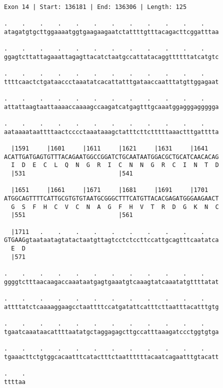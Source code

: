 \documentclass{article}
\begin{document}
\begin{Verbatim}
Exon 14 | Start: 136181 | End: 136306 | Length: 125
 
.    .    .    .    .    .    .    .    .    .    .    .    
atagatgtgcttggaaaatggtgaagaagaatctattttgtttacagacttcggatttaa
  
.    .    .    .    .    .    .    .    .    .    .    .    
ggagtcttattagaaattagagttacatctaatgccattatacaggttttttatcatgtc
  
.    .    .    .    .    .    .    .    .    .    .    .    
ttttcaactctgataaccctaaatatcacattatttgataaccaatttatgttggagaat
  
.    .    .    .    .    .    .    .    .    .    .    .    
attattaagtaattaaaaccaaaagccaagatcatgagtttgcaaatggagggaggggga
  
.    .    .    .    .    .    .    .    .    .    .    .    
aataaaataattttaactcccctaaataaagctatttcttctttttaaactttgatttta
  
  |1591     |1601     |1611     |1621     |1631     |1641   
ACATTGATGAGTGTTTACAGAATGGCCGGATCTGCAATAATGGACGCTGCATCAACACAG
  I  D  E  C  L  Q  N  G  R  I  C  N  N  G  R  C  I  N  T  D
  |531                          |541                        
  
  |1651     |1661     |1671     |1681     |1691     |1701   
ATGGCAGTTTTCATTGCGTGTGTAATGCGGGCTTTCATGTTACACGAGATGGGAAGAACT
  G  S  F  H  C  V  C  N  A  G  F  H  V  T  R  D  G  K  N  C
  |551                          |561                        
  
  |1711   .    .    .    .    .    .    .    .    .    .    
GTGAAGgtaataatagtatactaatgttagtcctctccttccattgcagtttcaatatca
  E  D                                                      
  |571                                                      
  
.    .    .    .    .    .    .    .    .    .    .    .    
ggggtctttaacaagaccaaataatgagtgaaatgtcaaagtatcaaatatgttttatat
  
.    .    .    .    .    .    .    .    .    .    .    .    
attttatctcaaaaggaagcctaattttccatgatattcatttcttaatttacatttgtg
  
.    .    .    .    .    .    .    .    .    .    .    .    
tgaatcaaataacattttaatatgctaggagagcttgccatttaaagatccctggtgtga
  
.    .    .    .    .    .    .    .    .    .    .    .    
tgaaacttctgtggcacaatttcatactttctaattttttacaatcagaatttgtacatt
  
.    .
ttttaa
\end{Verbatim}
\newpage
\end{document}
